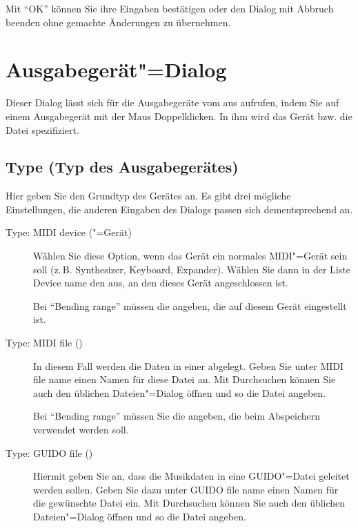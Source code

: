 {Mit "`OK"' können Sie ihre Eingaben bestätigen oder den Dialog 
mit Abbruch beenden ohne gemachte Änderungen zu übernehmen.

\section{Ausgabegerät"=Dialog}
\label{sec:DE_R4}

Dieser Dialog lässt sich für die Ausgabegeräte vom  
aus aufrufen, indem Sie auf einem Ausgabegerät mit der Maus 
Doppelklicken. In ihm wird das Gerät bzw. die Datei spezifiziert.

\subsection{Type (Typ des Ausgabegerätes)}

Hier geben Sie den Grundtyp des Gerätes an. Es gibt drei mögliche 
Einstellungen, die anderen Eingaben des Dialogs passen sich dementsprechend 
an.

\begin{description}
\item[Type: MIDI device ("=Gerät)] Wählen
  Sie diese Option, wenn das Gerät ein normales MIDI"=Gerät sein soll
  (z.\,B. Synthesizer, Keyboard, Expander). Wählen Sie dann in der Liste
  Device name den  aus, an den dieses
  Gerät angeschlossen ist.

  Bei "`Bending range"' müssen die  angeben, die auf diesem Gerät eingestellt ist.

\item[Type: MIDI file ()] In
  diesem Fall werden die Daten in einer
   abgelegt. Geben Sie unter
  MIDI file name einen Namen für diese Datei an. Mit Durchsuchen
  können Sie auch den üblichen Dateien"=Dialog öffnen und so die Datei
  angeben.

  Bei "`Bending range"' müssen Sie die
   angeben, die beim
  Abspeichern verwendet werden soll.

\item[Type: GUIDO file ()] Hiermit
  geben Sie an, dass die Musikdaten in eine GUIDO"=Datei geleitet
  werden sollen. Geben Sie dazu unter GUIDO file name einen Namen für
  die gewünschte Datei ein. Mit Durchsuchen können Sie auch den
  üblichen Dateien"=Dialog öffnen und so die Datei angeben.
\end{description}

}
